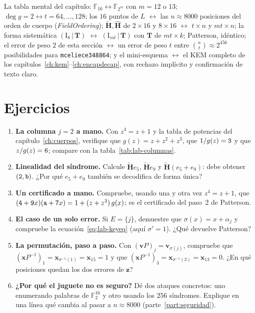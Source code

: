 \documentclass[11pt,a4paper,oneside]{report}
\newcommand{\F}{\mathbb{F}}
\newcommand{\GF}[1]{\mathbb{F}_{#1}}
\newcommand{\Hmat}{\mathbf{H}}          %
\newcommand{\Tmat}{\mathbf{T}}          %
\newcommand{\vx}{\mathbf{x}}
\newcommand{\vz}{\mathbf{z}}
\newcommand{\vv}{\mathbf{v}}
\newcommand{\Ftwo}{\F_2}
\newcommand{\hx}[1]{\text{\texttt{#1}}}
\begin{document}
\begin{practica}
La tabla mental del capítulo:
$\GF{16}\leftrightarrow\GF{2^m}$ con $m=12$ o $13$; $\deg g=2
\leftrightarrow t=64,\dots,128$; los $16$ puntos de $L$
$\leftrightarrow$ las $n\approx\num{8000}$ posiciones del orden de
cuerpo (\emph{FieldOrdering}); $\tilde{\Hmat},\hat{\Hmat}$ de $2\times16$ y
$8\times16$ $\leftrightarrow$ $t\times n$ y $mt\times n$; la forma
sistemática $(\mathrm{I}_8\,|\,\Tmat)$ $\leftrightarrow$
$(\mathrm{I}_{mt}\,|\,\Tmat)$ con $\Tmat$ de $mt\times k$; Patterson,
idéntico; el error de peso $2$ de esta sección $\leftrightarrow$ un
error de peso $t$ entre $\binom{n}{t}\approx2^{456}$ posibilidades para
\texttt{mceliece348864}; y el mini-esquema $\leftrightarrow$ el KEM
completo de los capítulos~\ref{ch:kem}--\ref{ch:encapdecap}, con
rechazo implícito y confirmación de texto claro.
\end{practica}

\section{Ejercicios}

\begin{enumerate}[leftmargin=1.6em,itemsep=4pt]
  \item \textbf{La columna $j=2$ a mano.} Con $z^4=z+1$ y la tabla de
        potencias del capítulo~\ref{ch:cuerpos}, verifique que
        $g(z)=z+z^2+z^3$, que $1/g(z)=\hx3$ y que $z/g(z)=\hx6$;
        compare con la tabla~\ref{tab:lab-columnas}.
  \item \textbf{Linealidad del síndrome.} Calcule $\tilde{\Hmat} e_5$,
        $\tilde{\Hmat} e_9$ y $\tilde{\Hmat}(e_5+e_9)$: debe obtener
        $(\hx2,\hx b)$. ¿Por qué $e_5+e_9$ también se decodifica de
        forma única?
  \item \textbf{Un certificado a mano.} Compruebe, usando una y otra vez
        $z^4=z+1$, que $(\hx4+\hx9x)(\hx a+\hx7x)=1+(z+z^3)\,g(x)$; es
        el certificado del paso~2 de Patterson.
  \item \textbf{El caso de un solo error.} Si $E=\{j\}$, demuestre que
        $\sigma(x)=x+\alpha_j$ y compruebe la
        ecuación~\eqref{eq:lab-keyeq} (aquí $\sigma'=1$).
        ¿Qué devuelve Patterson?
  \item \textbf{La permutación, paso a paso.} Con
        $(\vv P)_j=\vv_{\sigma(j)}$, compruebe que
        $(\vx P^{-1})_1=\vx_{\sigma^{-1}(1)}=\vx_{15}=1$ y que
        $(\vx P^{-1})_3=\vx_{\sigma^{-1}(3)}=\vx_{13}=0$. ¿En qué
        posiciones quedan los dos errores de $\vz$?
  \item \textbf{¿Por qué el juguete no es seguro?} Dé dos ataques
        concretos: uno enumerando palabras de $\Ftwo^{16}$ y otro
        usando los $256$ síndromes. Explique en una línea qué cambia al
        pasar a $n\approx\num{8000}$ (parte~\ref{part:seguridad}).
\end{enumerate}
\end{document}
